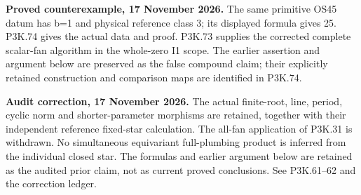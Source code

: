 \begin{theorem}\label{night:P3K.35}
\par\noindent\textbf{Proved counterexample, 17 November 2026.} The same primitive OS45 datum has b=1 and physical reference class 3; its displayed formula gives 25. P3K.74 gives the actual data and proof. P3K.73 supplies the corrected complete scalar-fan algorithm in the whole-zero I1 scope. The earlier assertion and argument below are preserved as the false compound claim; their explicitly retained construction and comparison maps are identified in P3K.74.

\par\noindent\textbf{Audit correction, 17 November 2026.} The actual finite-root, line, period, cyclic norm and shorter-parameter morphisms are retained, together with their independent reference fixed-star calculation. The all-fan application of P3K.31 is withdrawn. No simultaneous equivariant full-plumbing product is inferred from the individual closed star. The formulas and earlier argument below are retained as the audited prior claim, not as current proved conclusions. See P3K.61--62 and the correction ledger.
\medskip


\end{theorem}
